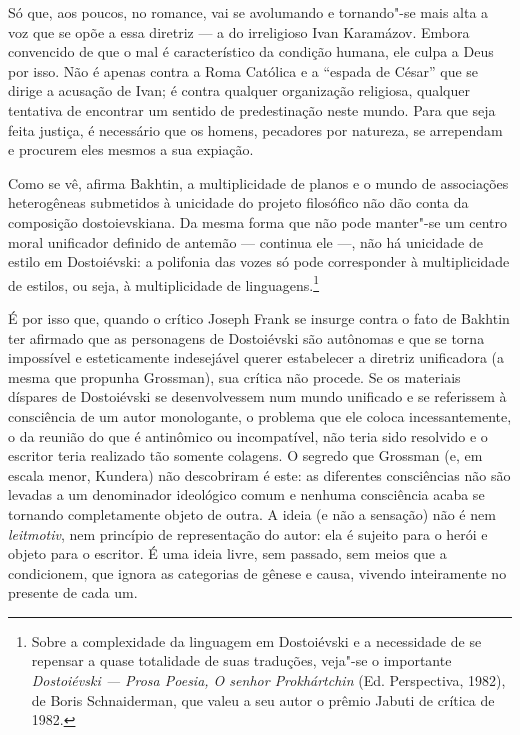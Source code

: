 Só que, aos poucos, no romance, vai se avolu­mando e tornando"-se mais
alta a voz que se opõe a essa diretriz --- a do irreligioso Ivan
Karamázov. Embora convencido de que o mal é característico da condição
humana, ele culpa a Deus por isso. Não é apenas contra a Roma Católica e
a ``espada de César'' que se dirige a acusação de Ivan; é contra
qualquer organização religiosa, qualquer tentativa de encontrar um
sentido de predestinação neste mundo. Para que seja feita justiça, é
necessário que os homens, pecadores por natureza, se arrependam e
procu­rem eles mesmos a sua expiação.

Como se vê, afirma Bakhtin, a multiplicidade de planos e o mundo de
associações heterogêneas submetidos à unicidade do projeto filosófico
não dão conta da composição dostoievskiana. Da mesma forma que não pode
manter"-se um centro moral unificador definido de antemão --- continua ele
---, não há unicidade de estilo em Dostoiévski: a polifonia das vozes só
pode corresponder à multiplicidade de estilos, ou seja, à multiplicidade
de linguagens.\footnote{Sobre a complexidade da linguagem em Dostoiévski
e a necessidade de se repensar a quase totalidade de suas traduções,
veja"-se o importante \emph{Dostoiévski --- Prosa Poesia, O senhor
Prokhártchin} (Ed. Perspectiva, 1982), de Boris Schnaiderman, que
valeu a seu autor o prêmio Jabuti de crítica de 1982.}

É por isso que, quando o crítico Joseph Frank se insurge contra o fato
de Bakhtin ter afirmado que as personagens de Dostoiévski são autônomas e
que se torna impossível e esteticamente indesejável querer estabelecer a
diretriz unificadora (a mesma que propunha Grossman), sua crítica não
procede. Se os materiais díspares de Dostoiévski se desenvolvessem num
mundo unificado e se referissem à consciência de um autor monologante, o
problema que ele coloca incessantemente, o da reunião do que é
antinômico ou incompatível, não teria sido resolvido e o escritor teria
realizado tão somente colagens. O segredo que Grossman (e, em escala
menor, Kundera) não descobriram é este: as diferentes consciências não
são levadas a um denominador ideológico comum e nenhuma consciência
acaba se tornando completamente objeto de outra. A ideia (e não a
sensação) não é nem \emph{leitmotiv}, nem princípio de representação do
autor: ela é sujeito para o herói e objeto para o escritor. É uma ideia
livre, sem passado, sem meios que a condicionem, que ignora as
categorias de gênese e causa, vivendo inteiramente no presente de cada
um.

